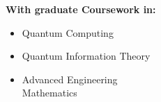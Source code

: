 
    \textbf{With graduate Coursework in:}
    \begin{itemize}
        \item Quantum Computing
        \item Quantum Information Theory
        \item Advanced Engineering \\Mathematics
    \end{itemize} \vfill\null
